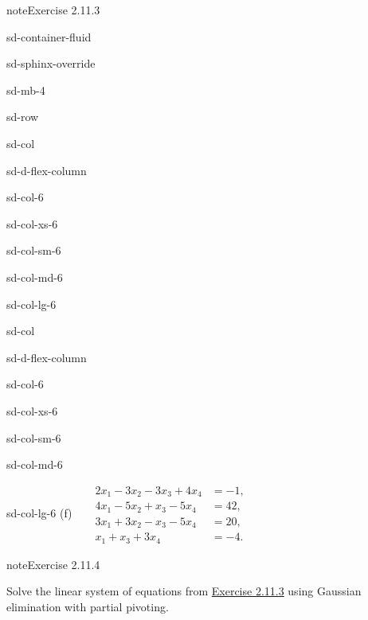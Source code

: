 \documentclass[letterpaper,10pt,english]{jupyterBook}
\begin{document}
\begin{sphinxadmonition}{note}{Exercise 2.11.3}
\begin{sphinxuseclass}{sd-container-fluid}
\begin{sphinxuseclass}{sd-sphinx-override}
\begin{sphinxuseclass}{sd-mb-4}
\begin{sphinxuseclass}{sd-row}
\begin{sphinxuseclass}{sd-col}
\begin{sphinxuseclass}{sd-d-flex-column}
\begin{sphinxuseclass}{sd-col-6}
\begin{sphinxuseclass}{sd-col-xs-6}
\begin{sphinxuseclass}{sd-col-sm-6}
\begin{sphinxuseclass}{sd-col-md-6}
\begin{sphinxuseclass}{sd-col-lg-6}
\end{sphinxuseclass}
\end{sphinxuseclass}
\end{sphinxuseclass}
\end{sphinxuseclass}
\end{sphinxuseclass}
\end{sphinxuseclass}
\end{sphinxuseclass}
\begin{sphinxuseclass}{sd-col}
\begin{sphinxuseclass}{sd-d-flex-column}
\begin{sphinxuseclass}{sd-col-6}
\begin{sphinxuseclass}{sd-col-xs-6}
\begin{sphinxuseclass}{sd-col-sm-6}
\begin{sphinxuseclass}{sd-col-md-6}
\begin{sphinxuseclass}{sd-col-lg-6}
\sphinxAtStartPar
(f)  
\( \begin{align*}
     2 x_{1} - 3 x_{2} - 3 x_{3} + 4 x_{4} &= -1, \\
     4 x_{1} - 5 x_{2} +  x_{3} - 5 x_{4} &= 42, \\
     3 x_{1} + 3 x_{2} -  x_{3} - 5 x_{4} &= 20, \\
     x_{1} +  x_{3} + 3 x_{4} &= -4.
\end{align*} \)

\end{sphinxuseclass}
\end{sphinxuseclass}
\end{sphinxuseclass}
\end{sphinxuseclass}
\end{sphinxuseclass}
\end{sphinxuseclass}
\end{sphinxuseclass}
\end{sphinxuseclass}
\end{sphinxuseclass}
\end{sphinxuseclass}
\end{sphinxuseclass}\end{sphinxadmonition}
 \label{exercise:systems-ex-gelimpp}

\begin{sphinxadmonition}{note}{Exercise 2.11.4}



\sphinxAtStartPar
Solve the linear system of equations from \hyperref[exercise:systems-ex-gelim]{Exercise 2.11.3} using Gaussian elimination with partial pivoting.
\end{sphinxadmonition}
 \label{exercise:systems-ex-gjelim}
\end{document}
